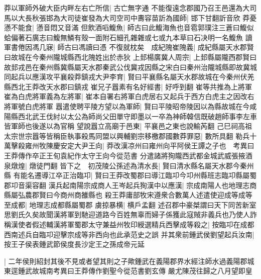 莽以軍師外破大臣内畔左右亡所信|{
	古亡無字通}
不能復遠念郡國乃召王邑還為大司馬以大長秋張邯為大司徒崔發為大司空司中夀容苗訢為國師|{
	邯下甘翻訢音欣}
莽憂懣不能食|{
	懣音悶又音滿}
但飲酒㗖鰒魚|{
	師古曰此鰒海魚也音雹郭璞注三蒼曰鰒似蛤偏著石廣志曰鰒無鱗有殼一面附石細孔雜雜或七或九本草曰石决明一名鰒魚}
讀軍書倦因馮几寐|{
	師古曰馮讀曰憑}
不復就枕矣　成紀隗崔隗義|{
	成紀縣屬天水郡賢曰故城在今秦州隴城縣西北隗姓出於赤狄}
上邽楊廣冀人周宗|{
	上邽縣屬隴西郡賢曰故邽戎邑在秦州縣冀縣屬天水郡秦武公伐冀戎因縣之宋白曰秦州治隴城縣即故冀城}
同起兵以應漢攻平襄殺莽鎮戎大尹李育|{
	賢曰平襄縣名屬天水郡故城在今秦州伏羌縣西北王莽改天水郡曰鎮戎}
崔兄子囂素有名好經書|{
	好呼到翻}
崔等共推為上將軍崔為白虎將軍義為左將軍|{
	崔本自署右將軍白虎居右又起兵于西方白虎主之因改右將軍號白虎將軍}
囂遣使聘平陵方望以為軍師|{
	賢曰平陵昭帝陵因以為縣故城在今咸陽縣西北武王伐紂以太公為師尚父田單守即墨以一卒為神師韓信既破趙師事李左車皆軍師也後遂以為官稱}
望說囂立高廟于邑東|{
	平襄邑之東也說輸芮翻}
己巳祠高祖太宗世宗囂等皆稱臣執事殺馬同盟以興輔劉宗移檄郡國數莽罪惡|{
	數所具翻}
勒兵十萬擊殺雍州牧陳慶安定大尹王向|{
	莽改漢凉州曰雍州向平阿侯王譚之子也　考異曰王莽傳作卒正王旬袁紀作太守王向今從范書}
分遣諸將狥隴西武都金城武威張掖酒泉燉煌|{
	燉徒門翻}
皆下之　初茂陵公孫述為清水長|{
	賢曰清水縣名屬天水郡今秦州縣}
有能名遷導江卒正治臨卭|{
	賢曰王莽改蜀郡曰導江臨卭今卭州縣班志臨卭縣屬蜀郡卭音渠容翻}
漢兵起南陽宗成商人王岑起兵狥漢中以應漢|{
	宗成南陽人也地理志商縣屬弘農郡賢曰今商州商雒縣也}
殺王莽庸部牧宋遵衆合數萬人述遣使迎成等成等至成都|{
	地理志成都縣屬蜀郡}
虜掠暴横|{
	横戶孟翻}
述召郡中豪桀謂曰天下同苦新室思劉氏久矣故聞漢將軍到馳迎道路今百姓無辜而婦子係獲此寇賊非義兵也乃使人詐稱漢使者假述輔漢將軍蜀郡太守兼益州牧印綬選精兵西擊成等殺之|{
	按臨卭在成都西南述兵自臨卭迎擊宗成等非西向也此承范史之誤}
并其衆前鍾武侯劉望起兵汝南|{
	按王子侯表鍾武節侯度長沙定王之孫成帝元延}


|{
	二年侯則紹封其後不見或者望其則之子歟鍾武在義陽郡界水經注師水過義陽郡城東逕鍾武故城南考異曰王莽傳作劉聖今從范書劉玄傳}
嚴尤陳茂往歸之八月望即皇


